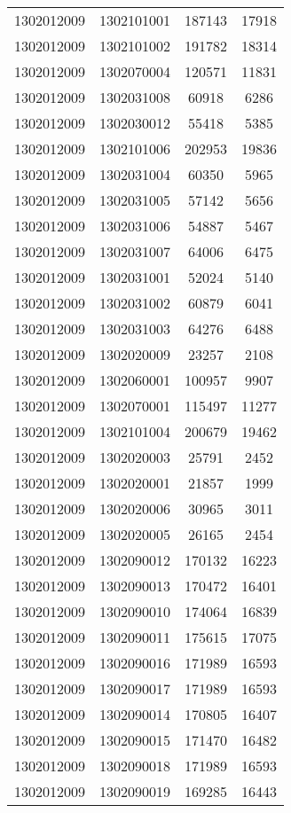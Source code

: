 \begin{longtable}[h]{llcc}
		1302012009 & 1302101001 & 187143 & 17918\\
		1302012009 & 1302101002 & 191782 & 18314\\
		1302012009 & 1302070004 & 120571 & 11831\\
		1302012009 & 1302031008 & 60918 & 6286\\
		1302012009 & 1302030012 & 55418 & 5385\\
		1302012009 & 1302101006 & 202953 & 19836\\
		1302012009 & 1302031004 & 60350 & 5965\\
		1302012009 & 1302031005 & 57142 & 5656\\
		1302012009 & 1302031006 & 54887 & 5467\\
		1302012009 & 1302031007 & 64006 & 6475\\
		1302012009 & 1302031001 & 52024 & 5140\\
		1302012009 & 1302031002 & 60879 & 6041\\
		1302012009 & 1302031003 & 64276 & 6488\\
		1302012009 & 1302020009 & 23257 & 2108\\
		1302012009 & 1302060001 & 100957 & 9907\\
		1302012009 & 1302070001 & 115497 & 11277\\
		1302012009 & 1302101004 & 200679 & 19462\\
		1302012009 & 1302020003 & 25791 & 2452\\
		1302012009 & 1302020001 & 21857 & 1999\\
		1302012009 & 1302020006 & 30965 & 3011\\
		1302012009 & 1302020005 & 26165 & 2454\\
		1302012009 & 1302090012 & 170132 & 16223\\
		1302012009 & 1302090013 & 170472 & 16401\\
		1302012009 & 1302090010 & 174064 & 16839\\
		1302012009 & 1302090011 & 175615 & 17075\\
		1302012009 & 1302090016 & 171989 & 16593\\
		1302012009 & 1302090017 & 171989 & 16593\\
		1302012009 & 1302090014 & 170805 & 16407\\
		1302012009 & 1302090015 & 171470 & 16482\\
		1302012009 & 1302090018 & 171989 & 16593\\
		1302012009 & 1302090019 & 169285 & 16443\\

\end{longtable}
